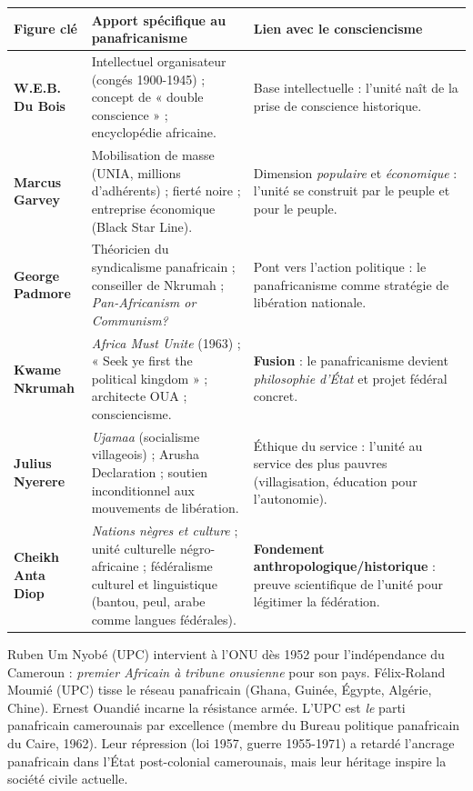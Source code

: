 \documentclass[11pt]{article}
\begin{document}
\begin{center}
\begin{tabularx}{\linewidth}{|l|X|X|}\hline
\rowcolor{popblueL}
\textbf{Figure clé} & \textbf{Apport spécifique au panafricanisme} & \textbf{Lien avec le consciencisme} \\ \hline
\textbf{W.E.B. Du Bois} & Intellectuel organisateur (congés 1900-1945) ; concept de « double conscience » ; encyclopédie africaine. & Base intellectuelle : l'unité naît de la prise de conscience historique. \\ \hline
\textbf{Marcus Garvey} & Mobilisation de masse (UNIA, millions d'adhérents) ; fierté noire ; entreprise économique (Black Star Line). & Dimension \emph{populaire} et \emph{économique} : l'unité se construit par le peuple et pour le peuple. \\ \hline
\textbf{George Padmore} & Théoricien du syndicalisme panafricain ; conseiller de Nkrumah ; \emph{Pan-Africanism or Communism?} & Pont vers l'action politique : le panafricanisme comme stratégie de libération nationale. \\ \hline
\textbf{Kwame Nkrumah} & \emph{Africa Must Unite} (1963) ; « Seek ye first the political kingdom » ; architecte OUA ; consciencisme. & \textbf{Fusion} : le panafricanisme devient \emph{philosophie d'État} et projet fédéral concret. \\ \hline
\textbf{Julius Nyerere} & \emph{Ujamaa} (socialisme villageois) ; Arusha Declaration ; soutien inconditionnel aux mouvements de libération. & Éthique du service : l'unité au service des plus pauvres (villagisation, éducation pour l'autonomie). \\ \hline
\textbf{Cheikh Anta Diop} & \emph{Nations nègres et culture} ; unité culturelle négro-africaine ; fédéralisme culturel et linguistique (bantou, peul, arabe comme langues fédérales). & \textbf{Fondement anthropologique/historique} : preuve scientifique de l'unité pour légitimer la fédération. \\ \hline
\end{tabularx}
\end{center}

\begin{savaistu}
Ruben Um Nyobé (UPC) intervient à l'ONU dès 1952 pour l'indépendance du Cameroun : \emph{premier Africain à tribune onusienne} pour son pays. Félix-Roland Moumié (UPC) tisse le réseau panafricain (Ghana, Guinée, Égypte, Algérie, Chine). Ernest Ouandié incarne la résistance armée. L'UPC est \emph{le} parti panafricain camerounais par excellence (membre du Bureau politique panafricain du Caire, 1962). Leur répression (loi 1957, guerre 1955-1971) a retardé l'ancrage panafricain dans l'État post-colonial camerounais, mais leur héritage inspire la société civile actuelle.
\end{savaistu}
\end{document}
